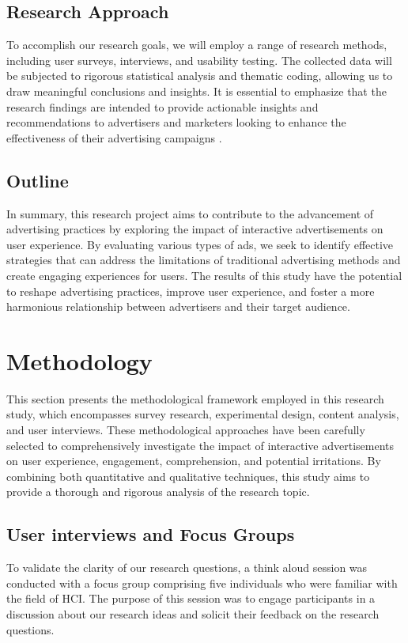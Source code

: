 \documentclass[journal]{IEEEtran}
\begin{document}
\subsection{Research Approach}
To accomplish our research goals, we will employ a range of research methods, including user
surveys, interviews, and usability testing. The collected data will be subjected to rigorous
statistical analysis and thematic coding, allowing us to draw meaningful conclusions and insights.
It is essential to emphasize that the research findings are intended to provide actionable
insights and recommendations to advertisers and marketers looking to enhance the
effectiveness of their advertising campaigns \cite{liang2008user}.

\subsection{Outline}
In summary, this research project aims to contribute to the advancement of advertising
practices by exploring the impact of interactive advertisements on user experience. By
evaluating various types of ads, we seek to identify effective strategies that can address
the limitations of traditional advertising methods and create engaging experiences for users.
The results of this study have the potential to reshape advertising practices, improve user
experience, and foster a more harmonious relationship between advertisers and their target audience.


\section{Methodology}
This section presents the methodological framework employed in this research study, which
encompasses survey research, experimental design, content analysis, and user interviews.
These methodological approaches have been carefully selected to comprehensively investigate
the impact of interactive advertisements on user experience, engagement, comprehension,
and potential irritations. By combining both quantitative and qualitative techniques,
this study aims to provide a thorough and rigorous analysis of the research topic.

\subsection{User interviews and Focus Groups}
To validate the clarity of our research questions, a think aloud session was conducted
with a focus group comprising five individuals who were familiar with the field of HCI.
The purpose of this session was to engage participants in a discussion about our research
ideas and solicit their feedback on the research questions.
\end{document}
